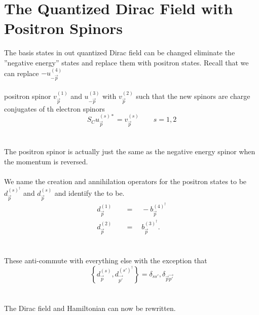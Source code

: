 \documentclass{report}
\begin{document}
\section{The Quantized Dirac Field with Positron Spinors}
The basis states in out quantized Dirac field can be changed eliminate the ''negative energy'' states and replace them with positron states. Recall that we can replace $\displaystyle -u^{(4)}_{-\vec{p}}$
\\
\\
positron spinor $\displaystyle v^{(1)}_{\vec{p}}$ and $\displaystyle u^{(3)}_{-\vec{p}}$ with $\displaystyle v^{(2)}_{\vec{p}}$ such that the new spinors are charge conjugates of th electron spinors
\begin{equation}
	S_{C}u^{(s)*}_{\vec{p}} = v^{(s)}_{\vec{p}} \qquad s = 1, 2
\end{equation}
\\
\\
The positron spinor is actually just the same as the negative energy spinor when the momentum is reversed.
\\
\\
We name the creation and annihilation operators for the positron states to be $\displaystyle d^{(s)^{\dagger}}_{\vec{p}}$ and $\displaystyle d^{(s)}_{\vec{p}}$ and identify the to be.
\begin{align*}
	d^{(1)}_{\vec{p}} \quad & = \quad -b^{(4)^{\dagger}}_{\vec{p}} \\
	d^{(2)}_{\vec{p}} \quad & = \quad b^{(3)^{\dagger}}_{\vec{p}}
	.\end{align*}
\\
\\
These anti-commute with everything else with the exception that
\begin{equation}
	\left\{ d^{(s)}_{\vec{p}}, d^{\left( s' \right) ^{\dagger}}_{\vec{p'}} \right\} = \delta_{ss'}, \delta_{\vec{p} \vec{p'}}
\end{equation}
\\
\\
The Dirac field and Hamiltonian can now be rewritten.
\end{document}
